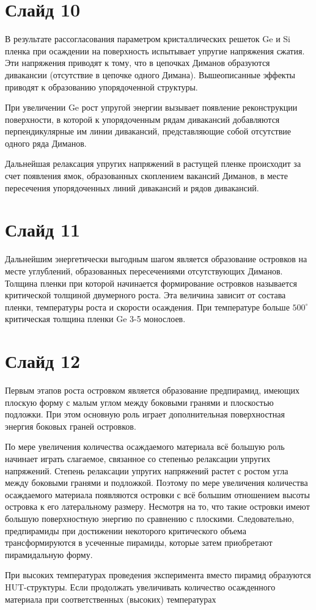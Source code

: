 \section*{Слайд 10}
В результате рассогласования	параметром кристаллических решеток Ge и Si пленка при осаждении на поверхность испытывает упругие напряжения сжатия. Эти напряжения приводят к тому, что в цепочках Диманов образуются дивакансии (отсутствие в цепочке одного Димана). Вышеописанные эффекты приводят к образованию упорядоченной структуры. 

При увеличении Ge рост упругой энергии вызывает появление реконструкции поверхности, в которой к  упорядоченным рядам дивакансий добавляются перпендикулярные им линии дивакансий, представляющие собой отсутствие одного ряда Диманов.  

Дальнейшая релаксация упругих напряжений в растущей пленке происходит за счет появления ямок, образованных скоплением вакансий Диманов, в месте пересечения
упорядоченных линий дивакансий и рядов дивакансий. 
\section*{Слайд 11}

Дальнейшим энергетически выгодным 
шагом является образование островков на месте углублений, образованных пересечениями отсутствующих Диманов. Толщина пленки при которой начинается формирование островков называется критической толщиной двумерного роста. Эта величина зависит от состава пленки, температуры роста и скорости осаждения. При температуре больше $500^{\circ}$ критическая толщина пленки Ge 3-5 монослоев. 

\section*{Слайд 12} %


Первым этапов роста островком является образование предпирамид, имеющих плоскую форму с малым углом между боковыми гранями и плоскостью подложки. При этом основную роль играет дополнительная поверхностная энергия боковых граней островков.

По мере увеличения количества осаждаемого материала всё большую роль начинает играть слагаемое, связанное со степенью релаксации упругих напряжений. Степень релаксации упругих напряжений растет с ростом угла между боковыми гранями и подложкой. Поэтому по мере увеличения количества осаждаемого материала появляются островки с всё большим отношением высоты островка к его латеральному размеру. Несмотря на то, что такие островки имеют большую поверхностную энергию  по сравнению с плоскими.
Следовательно, предпирамиды при достижении некоторого критического объема трансформируются в усеченные пирамиды, которые затем приобретают пирамидальную форму. 


При высоких температурах проведения эксперимента вместо пирамид образуются HUT-структуры. Если продолжать увеличивать количество осажденного материала при соответственных (высоких) температурах 

